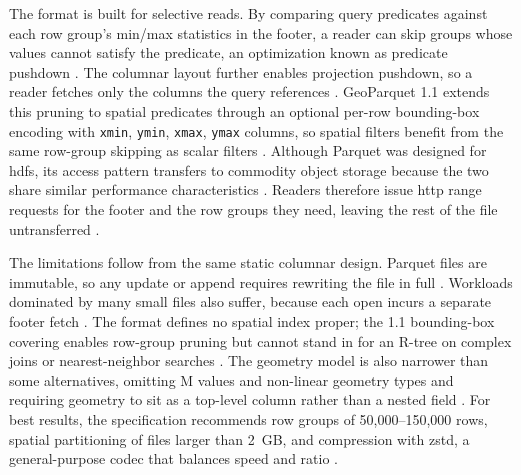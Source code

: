 The format is built for selective reads. By comparing query predicates against each row group's min/max statistics in the footer, a reader can skip groups whose values cannot satisfy the predicate, an optimization known as predicate pushdown \parencite{lamb2022_querying_parquet_millisecond_latency}. The columnar layout further enables projection pushdown, so a reader fetches only the columns the query references \parencite{lamb2022_querying_parquet_millisecond_latency}. GeoParquet 1.1 extends this pruning to spatial predicates through an optional per-row bounding-box encoding with \texttt{xmin}, \texttt{ymin}, \texttt{xmax}, \texttt{ymax} columns, so spatial filters benefit from the same row-group skipping as scalar filters \parencite{ogc2024_geoparquet_specification_v110}. Although Parquet was designed for \acrfull{hdfs}, its access pattern transfers to commodity object storage because the two share similar performance characteristics \parencite{lamb2022_querying_parquet_millisecond_latency}. Readers therefore issue \acrshort{http} range requests for the footer and the row groups they need, leaving the rest of the file untransferred \parencite{cngfoundation2024_cloud_optimized_geospatial_formats_guide}.

The limitations follow from the same static columnar design. Parquet files are immutable, so any update or append requires rewriting the file in full \parencite{microsoft2024_direct_lake_parquet_immutability}. Workloads dominated by many small files also suffer, because each open incurs a separate footer fetch \parencite{cngfoundation2024_geoparquet_guide}. The format defines no spatial index proper; the 1.1 bounding-box covering enables row-group pruning but cannot stand in for an R-tree on complex joins or nearest-neighbor searches \parencite{cngfoundation2024_geoparquet_guide}. The geometry model is also narrower than some alternatives, omitting M values and non-linear geometry types and requiring geometry to sit as a top-level column rather than a nested field \parencite{ogc2024_geoparquet_specification_v110}. For best results, the specification recommends row groups of 50,000--150,000 rows, spatial partitioning of files larger than 2~GB, and compression with zstd, a general-purpose codec that balances speed and ratio \parencite{ogc2024_distributing_geoparquet}.



